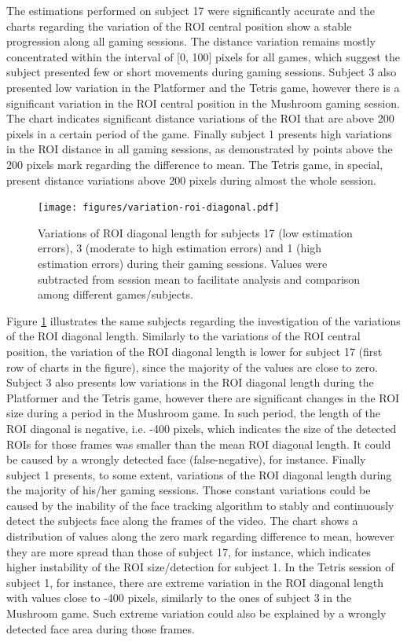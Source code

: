The estimations performed on subject 17 were significantly accurate and the charts regarding the variation of the ROI central position show a stable progression along all gaming sessions. The distance variation remains mostly concentrated within the interval of [0, 100] pixels for all games, which suggest the subject presented few or short movements during gaming sessions. Subject 3 also presented low variation in the Platformer and the Tetris game, however there is a significant variation in the ROI central position in the Mushroom gaming session. The chart indicates significant distance variations of the ROI that are above 200 pixels in a certain period of the game. Finally subject 1 presents high variations in the ROI distance in all gaming sessions, as demonstrated by points above the 200 pixels mark regarding the difference to mean. The Tetris game, in special, present distance variations above 200 pixels during almost the whole session.

\begin{figure}[!h]
\centering
\texttt{[image: figures/variation-roi-diagonal.pdf]}
\caption{Variations of ROI diagonal length for subjects 17 (low estimation errors), 3 (moderate to high estimation errors) and 1 (high estimation errors) during their gaming sessions. Values were subtracted from session mean to facilitate analysis and comparison among different games/subjects.}
\label{fig:chart-roi-anomalies-diagonal}
\end{figure}

Figure \ref{fig:chart-roi-anomalies-diagonal} illustrates the same subjects regarding the investigation of the variations of the ROI diagonal length. Similarly to the variations of the ROI central position, the variation of the ROI diagonal length is lower for subject 17 (first row of charts in the figure), since the majority of the values are close to zero. Subject 3 also presents low variations in the ROI diagonal length during the Platformer and the Tetris game, however there are significant changes in the ROI size during a period in the Mushroom game. In such period, the length of the ROI diagonal is negative, i.e. -400 pixels, which indicates the size of the detected ROIs for those frames was smaller than the mean ROI diagonal length. It could be caused by a wrongly detected face (false-negative), for instance. Finally subject 1 presents, to some extent, variations of the ROI diagonal length during the majority of his/her gaming sessions. Those constant variations could be caused by the inability of the face tracking algorithm to stably and continuously detect the subjects face along the frames of the video. The chart shows a distribution of values along the zero mark regarding difference to mean, however they are more spread than those of subject 17, for instance, which indicates higher instability of the ROI size/detection for subject 1. In the Tetris session of subject 1, for instance, there are extreme variation in the ROI diagonal length with values close to -400 pixels, similarly to the ones of subject 3 in the Mushroom game. Such extreme variation could also be explained by a wrongly detected face area during those frames.

